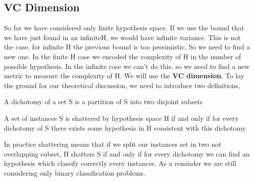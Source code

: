 \documentclass[main.tex]{subfiles}
\begin{document}
\subsection{VC Dimension}
So far we have considered only finite hypothesis space. If we use the bound that we have just found in an infinite\footnotemark H, we would have infinite variance. This is not the case, for infinite H the previous bound is too pessimistic. So we need to find a new one. In the finite H case we encoded the complexity of H in the number of possible hypothesis. In the infinite case we can't do this, so we need to find a new metric to measure the complexity of H. We will use the \textbf{VC dimension}. To lay the ground for our theoretical discussion, we need to introduce two definitions,
\begin{definition}[Dichotomy]
A dichotomy of a set S is a partition of S into two disjoint subsets
\end{definition}
\begin{definition}[Shattering]
A set of instances S is shattered by hypothesis space H if and only if for
every dichotomy of S there exists some hypothesis in H consistent with this
dichotomy
\end{definition}
In practice shattering means that if we split our instances set in two not overlapping subset, H shatters S if and only if for every dichotomy we can find an hypothesis which classify correctly every instances. As a reminder we are still considering only binary classification problems.
\end{document}
